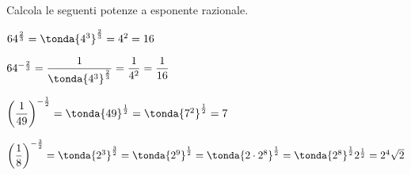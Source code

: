 \begin{esempio}
 Calcola le seguenti potenze a esponente razionale.
 \begin{itemize*}
 \item $64^{\frac{2}{3}}=\tonda{4^3}^{\frac{2}{3}}=4^2=16$
 \item $64^{-\frac{2}{3}}=\dfrac{1}{\tonda{4^3}^{\frac{2}{3}}}=
   \dfrac{1}{4^2}=\dfrac{1}{16}$
 \item $\left(\dfrac 1{49}\right)^{-\frac{1}{2}}=
        \tonda{49}^{\frac{1}{2}}=\tonda{7^2}^{\frac{1}{2}}=7$
 \item $\left(\dfrac{1}{8}\right)^{-\frac{3}{2}}=
   \tonda{2^3}^{\frac{3}{2}}=
   \tonda{2^9}^\frac{1}{2}=
   \tonda{2 \cdot 2^8}^\frac{1}{2}=
   \tonda{2^8}^{\frac{1}{2}}2^{\frac{1}{2}}=2^4 \sqrt{2}$
\end{itemize*}
\end{esempio}

